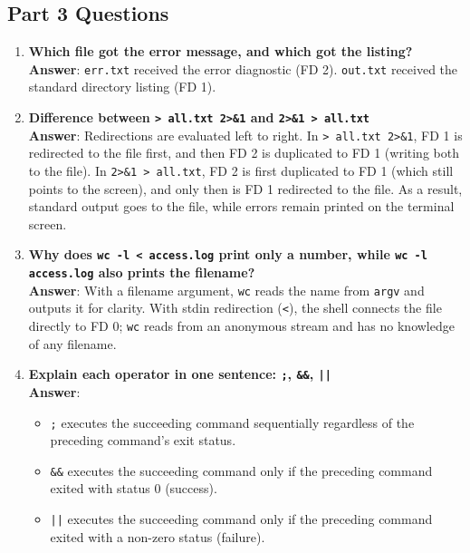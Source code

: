 \documentclass[12pt,a4paper]{article}
\begin{document}
\subsection{Part 3 Questions}
\begin{enumerate}
    \item \textbf{Which file got the error message, and which got the listing?} \\
    \textbf{Answer}: \texttt{err.txt} received the error diagnostic (FD 2). \texttt{out.txt} received the standard directory listing (FD 1).
    
    \item \textbf{Difference between \texttt{> all.txt 2>\&1} and \texttt{2>\&1 > all.txt}} \\
    \textbf{Answer}: Redirections are evaluated left to right. In \texttt{> all.txt 2>\&1}, FD 1 is redirected to the file first, and then FD 2 is duplicated to FD 1 (writing both to the file). In \texttt{2>\&1 > all.txt}, FD 2 is first duplicated to FD 1 (which still points to the screen), and only then is FD 1 redirected to the file. As a result, standard output goes to the file, while errors remain printed on the terminal screen.
    
    \item \textbf{Why does \texttt{wc -l < access.log} print only a number, while \texttt{wc -l access.log} also prints the filename?} \\
    \textbf{Answer}: With a filename argument, \texttt{wc} reads the name from \texttt{argv} and outputs it for clarity. With stdin redirection (\texttt{<}), the shell connects the file directly to FD 0; \texttt{wc} reads from an anonymous stream and has no knowledge of any filename.
    
    \item \textbf{Explain each operator in one sentence: \texttt{;}, \texttt{\&\&}, \texttt{||}} \\
    \textbf{Answer}:
    \begin{itemize}
        \item \texttt{;} executes the succeeding command sequentially regardless of the preceding command's exit status.
        \item \texttt{\&\&} executes the succeeding command only if the preceding command exited with status 0 (success).
        \item \texttt{||} executes the succeeding command only if the preceding command exited with a non-zero status (failure).
    \end{itemize}
\end{enumerate}
\end{document}
